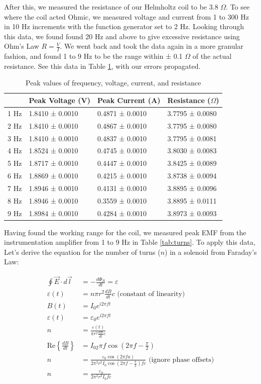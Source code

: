 \documentclass[12pt,letterpaper]{article}
\begin{document}
After this, we measured the resistance of our Helmholtz coil to be 3.8 $\Omega$. To see where the coil acted Ohmic, we measured voltage and current from 1 to 300 Hz in 10 Hz increments with the function generator set to 2 Hz. Looking through this data, we found found 20 Hz and above to give excessive resistance using Ohm's Law $R=\frac{V}{I}$. We went back and took the data again in a more granular fashion, and found 1 to 9 Hz to be the range within ± 0.1 $\Omega$ of the actual resistance. See this data in Table \ref{tab:ohmic}, with our errors propagated.

\begin{table}[ht]
\centering
\begin{tabular}{|l|l|l|l|}
\hline
 & Peak Voltage (V) & Peak Current (A) & Resistance ($\Omega$) \\ \hline
1 Hz & 1.8410 ± 0.0010 & 0.4871 ± 0.0010 & 3.7795 ± 0.0080 \\ \hline
2 Hz & 1.8410 ± 0.0010 & 0.4867 ± 0.0010 & 3.7795 ± 0.0080 \\ \hline
3 Hz & 1.8410 ± 0.0010 & 0.4837 ± 0.0010 & 3.7795 ± 0.0081 \\ \hline
4 Hz & 1.8524 ± 0.0010 & 0.4745 ± 0.0010 & 3.8030 ± 0.0083 \\ \hline
5 Hz & 1.8717 ± 0.0010 & 0.4447 ± 0.0010 & 3.8425 ± 0.0089 \\ \hline
6 Hz & 1.8869 ± 0.0010 & 0.4215 ± 0.0010 & 3.8738 ± 0.0094 \\ \hline
7 Hz & 1.8946 ± 0.0010 & 0.4131 ± 0.0010 & 3.8895 ± 0.0096 \\ \hline
8 Hz & 1.8946 ± 0.0010 & 0.3559 ± 0.0010 & 3.8895 ± 0.0111 \\ \hline
9 Hz & 1.8984 ± 0.0010 & 0.4284 ± 0.0010 & 3.8973 ± 0.0093 \\ \hline
\end{tabular}
\caption{Peak values of frequency, voltage, current, and resistance}
\label{tab:ohmic}
\end{table}

Having found the working range for the coil, we measured peak EMF from the instrumentation amplifier from 1 to 9 Hz in Table \ref{tab:turns}. To apply this data, Let's derive the equation for the number of turns ($n$) in a solenoid from Faraday's Law:

\begin{align*}
    \oint \vec{E}\cdot d\vec{l}&=-\frac{d\Phi_B}{dt}=\varepsilon \\
    \varepsilon(t)&=n\pi r^2 \frac{dB}{dt}c \text{ (constant of linearity)} \\
    B(t)&=I_0e^{i2\pi ft} \\
    \varepsilon(t)&=\varepsilon_0e^{i2\pi f t} \\
    n&= \frac{\varepsilon(t)}{\pi r^2 \frac{dB}{dt}c} \\
    \text{Re}\left\{\frac{dB}{dt}\right\}&=I_02\pi f\cos\left(2\pi f  - \frac{\pi}{2}\right) \\
    n&=\frac{\varepsilon_0\cos(2\pi fa)}{2\pi^2 r^2 I_0 \cos\left(2\pi f - \frac{\pi}{2}\right)f c} \text{ (ignore phase offsets)}\\
    n&=\frac{\varepsilon_0}{2\pi^2 r^2 I_0 f c}
\end{align*}
\end{document}
